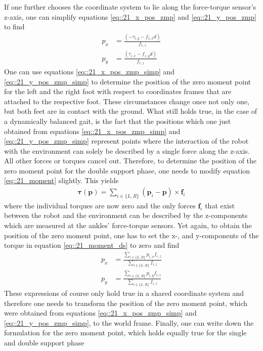 If one further chooses the coordinate system to lie along the force-torque sensor's z-axis, one can simplify equations \ref{eq::21_x_pos_zmp} and \ref{eq::21_y_pos_zmp} to find
\begin{align}
	p_x &= \frac{(-\tau_{i,y}-f_{1,x}d)}{f_{1,z}} 
	\label{eq::21_x_pos_zmp_simp}\\
	p_y &= \frac{(\tau_{i,x}-f_{1,y}d)}{f_{1,z}}
	\label{eq::21_y_pos_zmp_simp}
\end{align}
One can use equations \ref{eq::21_x_pos_zmp_simp} and \ref{eq::21_y_pos_zmp_simp} to determine the position of the zero moment point for the left and the right foot with respect to coordinates frames that are attached to the respective foot. These circumstances change once not only one, but both feet are in contact with the ground. What still holds true, in the case of a dynamically balanced gait, is the fact that the positions which one just obtained from equations \ref{eq::21_x_pos_zmp_simp} and \ref{eq::21_y_pos_zmp_simp} represent points where the interaction of the robot with the environment can solely be described by a single force along the z-axis. All other forces or torques cancel out. Therefore, to determine the position of the zero moment point for the double support phase, one needs to modify equation \ref{eq::21_moment} slightly. This yields 
\begin{align}
	\bm{\tau}(\bm{p}) = \sum_{i\in\{L, R\}} (\bm{p}_i - \bm{p})\times\bm{f}_i
	\label{eq::21_moment_ds}
\end{align}
where the individual torques are now zero and the only forces $\bm{f}_i$ that exist between the robot and the environment can be described by the z-components which are measured at the ankles' force-torque sensors. Yet again, to obtain the position of the zero moment point, one has to set the x-, and y-components of the torque in equation \ref{eq::21_moment_ds} to zero and find
\begin{align}
	p_x &= \frac{\sum_{i\in\{L, R\}}p_{i,x}f_{i,z}}{\sum_{i\in\{L, R\}}f_{i,z}} \\
	p_y &= \frac{\sum_{i\in\{L, R\}}p_{i,y}f_{i,z}}{\sum_{i\in\{L, R\}}f_{i,z}}
\end{align}
These expressions of course only hold true in a shared coordinate system and therefore one needs to transform the position of the zero moment point, which were obtained from equations \ref{eq::21_x_pos_zmp_simp} and \ref{eq::21_y_pos_zmp_simp}, to the world frame. Finally, one can write down the formulation for the zero moment point, which holds equally true for the single and double support phase
